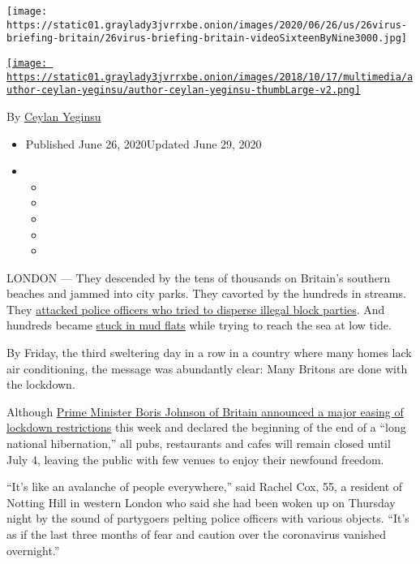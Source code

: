 \texttt{[image: https://static01.graylady3jvrrxbe.onion/images/2020/06/26/us/26virus-briefing-britain/26virus-briefing-britain-videoSixteenByNine3000.jpg]}

\href{https://www.nytimes3xbfgragh.onion/by/ceylan-yeginsu}{\texttt{[image: https://static01.graylady3jvrrxbe.onion/images/2018/10/17/multimedia/author-ceylan-yeginsu/author-ceylan-yeginsu-thumbLarge-v2.png]}}

By \href{https://www.nytimes3xbfgragh.onion/by/ceylan-yeginsu}{Ceylan
Yeginsu}

\begin{itemize}
\item
  Published June 26, 2020Updated June 29, 2020
\item
  \begin{itemize}
  \item
  \item
  \item
  \item
  \item
  \end{itemize}
\end{itemize}

LONDON --- They descended by the tens of thousands on Britain's southern
beaches and jammed into city parks. They cavorted by the hundreds in
streams. They
\href{https://www.nytimes3xbfgragh.onion/2020/06/25/world/europe/brixton-party-police.html}{attacked
police officers who tried to disperse illegal block parties}. And
hundreds became
\href{https://www.somersetlive.co.uk/news/somerset-news/tourists-trapped-mud-flats-trying-4265533}{stuck
in mud flats} while trying to reach the sea at low tide.

By Friday, the third sweltering day in a row in a country where many
homes lack air conditioning, the message was abundantly clear: Many
Britons are done with the lockdown.

Although
\href{https://www.nytimes3xbfgragh.onion/2020/06/23/world/europe/uk-coronavirus-reopening.html}{Prime
Minister Boris Johnson of Britain announced a major easing of lockdown
restrictions} this week and declared the beginning of the end of a
``long national hibernation,'' all pubs, restaurants and cafes will
remain closed until July 4, leaving the public with few venues to enjoy
their newfound freedom.

``It's like an avalanche of people everywhere,'' said Rachel Cox, 55, a
resident of Notting Hill in western London who said she had been woken
up on Thursday night by the sound of partygoers pelting police officers
with various objects. ``It's as if the last three months of fear and
caution over the coronavirus vanished overnight.''

